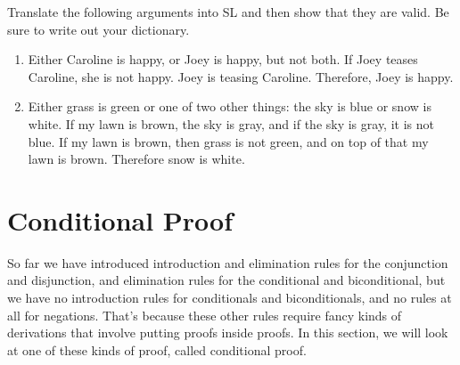 \noindent\problempart
Translate the following arguments into SL and then show that they are valid. Be sure to write out your dictionary. 
\begin{enumerate}[label=(\arabic*)]

\item Either Caroline is happy, or Joey is happy, but not both. If Joey teases Caroline, she is not happy. Joey is teasing Caroline. Therefore, Joey is happy.

%

\item Either grass is green or one of two other things: the sky is blue or snow is white. If my lawn is brown, the sky is gray, and if the sky is gray, it is not blue. If my lawn is brown, then grass is not green, and on top of that my lawn is brown. Therefore snow is white.

\end{enumerate}

\section{Conditional Proof}
\label{sec:conditional_proof}
\setlength{\parindent}{1em}

So far we have introduced introduction and elimination rules for the conjunction and disjunction, and elimination rules for the conditional and biconditional, but we have no introduction rules for conditionals and biconditionals, and no rules at all for negations. That's because these other rules require fancy kinds of derivations that involve putting proofs inside proofs. In this section, we will look at one of these kinds of proof, called conditional proof.



